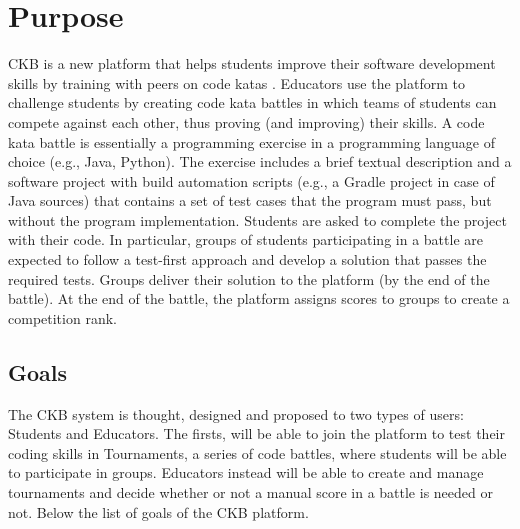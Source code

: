 \section{Purpose}
\ac{CKB} is a new platform that helps students improve their software development skills by training with peers on code katas . Educators use the platform to challenge students by creating code kata battles in which teams of students can compete against each other, thus proving (and improving) their skills.\newline
A code kata battle is essentially a programming exercise in a programming language of choice (e.g., Java, Python). The exercise includes a brief textual description and a software project with build automation scripts (e.g., a Gradle project in case of Java sources) that contains a set of test cases that the program must pass, but without the program implementation. Students are asked to complete the project with their code. In particular, groups of students participating in a battle are expected to follow a test-first approach and develop a solution that passes the required tests. Groups deliver their solution to the platform (by the end of the battle). At the end of the battle, the platform assigns scores to groups to create a competition rank.
\subsection{Goals}
The \ac{CKB} system is thought, designed and proposed to two types of users: Students and Educators.\newline
The firsts, will be able to join the platform to test their coding skills in Tournaments, a series of code battles, where students will be able to participate in groups.\newline
Educators instead will be able to create and manage tournaments and decide whether or not a manual score in a battle is needed or not.\newline
Below the list of goals of the \ac{CKB} platform.\newline

